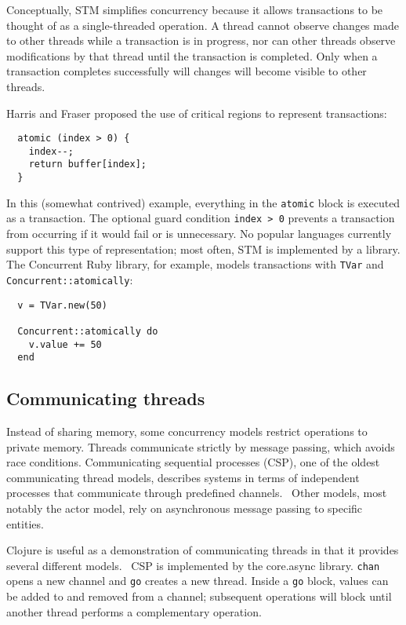 \documentclass{sig-alternate}
\newcommand{\code}[1]{\texttt{#1}}
\begin{document}
Conceptually, STM simplifies concurrency because it allows transactions to be thought of as a single-threaded operation. A thread cannot observe changes made to other threads while a transaction is in progress, nor can other threads observe modifications by that thread until the transaction is completed. Only when a transaction completes successfully will changes will become visible to other threads.

Harris and Fraser proposed the use of critical regions to represent transactions:~\cite{Harris2014}

\begin{lstlisting}
  atomic (index > 0) {
    index--;
    return buffer[index];
  }
\end{lstlisting}

In this (somewhat contrived) example, everything in the \code{atomic} block is executed as a transaction. The optional guard condition \code{index > 0} prevents a transaction from occurring if it would fail or is unnecessary. No popular languages currently support this type of representation; most often, STM is implemented by a library. The Concurrent Ruby library, for example, models transactions with \code{TVar} and \code{Concurrent::atomically}:~\cite{ConcurrentRubyTVar}

\begin{lstlisting}
  v = TVar.new(50)

  Concurrent::atomically do
    v.value += 50
  end
\end{lstlisting}

\subsection{Communicating threads}

Instead of sharing memory, some concurrency models restrict operations to private memory. Threads communicate strictly by message passing, which avoids race conditions. Communicating sequential processes (CSP), one of the oldest communicating thread models, describes systems in terms of independent processes that communicate through predefined channels.~\cite{Hoare1978} Other models, most notably the actor model, rely on asynchronous message passing to specific entities.~\cite{Agha1986}

Clojure is useful as a demonstration of communicating threads in that it provides several different models.~\cite{Swalens2014} CSP is implemented by the core.async library. \code{chan} opens a new channel and \code{go} creates a new thread. Inside a \code{go} block, values can be added to and removed from a channel; subsequent operations will block until another thread performs a complementary operation.
\end{document}
